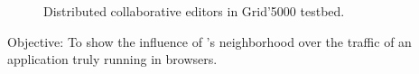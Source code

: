 \begin{figure}
  \centering
  \hspace{10pt}
  \caption{Distributed collaborative editors in Grid'5000 testbed.}
\end{figure}

\begin{asparadesc}
\item [Objective:] To show the influence of \SPRAY's neighborhood over the
  traffic of an application truly running in browsers.
\end{asparadesc}


